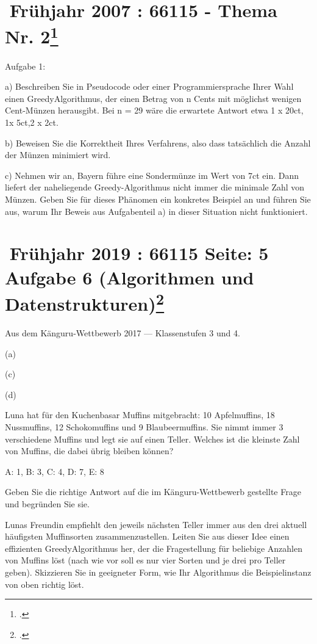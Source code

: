 \documentclass{lehramt-informatik}
\begin{document}
\begin{enumerate}
\section{Frühjahr 2007 : 66115 - Thema Nr. 2\footcite{examen:66115:2007:03}}

Aufgabe 1:

a) Beschreiben Sie in Pseudocode oder einer Programmiersprache Ihrer Wahl einen GreedyAlgorithmus, der einen Betrag von n Cents mit möglichst wenigen Cent-Münzen herausgibt.
Bei n = 29 wäre die erwartete Antwort etwa 1 x 20ct, 1x 5ct,2 x 2ct.

b) Beweisen Sie die Korrektheit Ihres Verfahrens, also dass tatsächlich die Anzahl der Münzen
minimiert wird.

c) Nehmen wir an, Bayern führe eine Sondermünze im Wert von 7ct ein. Dann liefert der naheliegende Greedy-Algorithmus nicht immer die minimale Zahl von Münzen. Geben Sie für dieses
Phänomen ein konkretes Beispiel an und führen Sie aus, warum Ihr Beweis aus Aufgabenteil
a) in dieser Situation nicht funktioniert.

%

\section{Frühjahr 2019 : 66115 Seite: 5 Aufgabe 6 (Algorithmen und Datenstrukturen)\footcite{examen:66115:2019:03}}

Aus dem Känguru-Wettbewerb 2017 — Klassenstufen 3 und 4.

(a)

(c)

(d)

Luna hat für den Kuchenbasar Muffins mitgebracht: 10 Apfelmuffins, 18 Nussmuffins,
12 Schokomuffins und 9 Blaubeermuffins. Sie nimmt immer 3 verschiedene Muffins
und legt sie auf einen Teller. Welches ist die kleinste Zahl von Muffins, die dabei übrig
bleiben können?

A: 1, B: 3, C: 4, D: 7, E: 8

Geben Sie die richtige Antwort auf die im Känguru-Wettbewerb gestellte Frage und begründen Sie sie.

Lunas Freundin empfiehlt den jeweils nächsten Teller immer aus den drei aktuell häufigsten Muffinsorten zusammenzustellen. Leiten Sie aus dieser Idee einen effizienten GreedyAlgorithmus her, der die Fragestellung für beliebige Anzahlen von Muffins löst (nach wie
vor soll es nur vier Sorten und je drei pro Teller geben). Skizzieren Sie in geeigneter Form,
wie Ihr Algorithmus die Beispielinstanz von oben richtig löst.


\end{enumerate}
\end{document}
